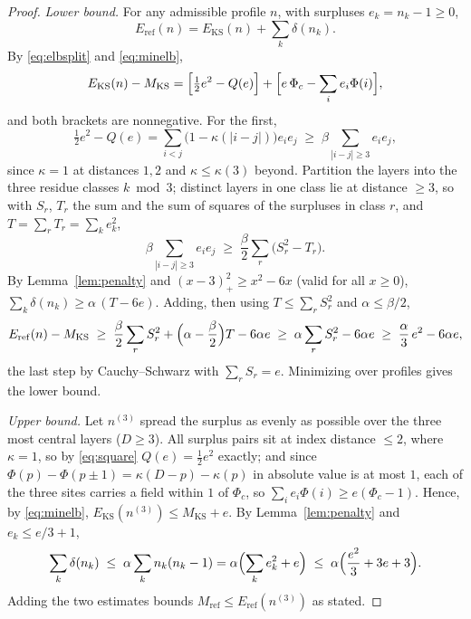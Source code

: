 \documentclass[10pt,a4paper]{amsart}
\newcommand{\KS}{\mathrm{KS}}
\newcommand{\refi}{\mathrm{ref}}
\begin{document}
\begin{proof}
\emph{Lower bound.} For any admissible profile $n$, with surpluses $e_k=n_k-1\ge0$,
\[
E_\refi(n) = E_\KS(n) + \sum_k \delta(n_k).
\]
By \eqref{eq:elbsplit} and \eqref{eq:minelb},
\[
E_\KS(n)-M_\KS = \Bigl[\tfrac12 e^2 - Q(e)\Bigr] + \Bigl[e\,\Phi_c - \sum_i e_i\Phi(i)\Bigr],
\]
and both brackets are nonnegative. For the first,
\[
\tfrac12 e^2 - Q(e) = \sum_{i<j}\bigl(1-\kappa(|i-j|)\bigr)e_i e_j \;\ge\; \beta \!\!\sum_{|i-j|\ge3}\!\! e_i e_j,
\]
since $\kappa=1$ at distances $1,2$ and $\kappa\le\kappa(3)$ beyond. Partition the layers into the three residue classes $k\bmod3$; distinct layers in one class lie at distance $\ge3$, so with $S_r$, $T_r$ the sum and the sum of squares of the surpluses in class $r$, and $T=\sum_r T_r=\sum_k e_k^2$,
\[
\beta \!\!\sum_{|i-j|\ge3}\!\! e_i e_j \;\ge\; \frac\beta2 \sum_r \bigl(S_r^2 - T_r\bigr).
\]
By Lemma~\ref{lem:penalty} and $(x-3)_+^2\ge x^2-6x$ (valid for all $x\ge0$), $\sum_k\delta(n_k)\ge\alpha\,(T-6e)$. Adding, then using $T\le\sum_r S_r^2$ and $\alpha\le\beta/2$,
\[
E_\refi(n)-M_\KS \;\ge\; \frac\beta2\sum_r S_r^2 + \Bigl(\alpha-\frac\beta2\Bigr)T - 6\alpha e
\;\ge\; \alpha\sum_r S_r^2 - 6\alpha e
\;\ge\; \frac\alpha3\,e^2 - 6\alpha e,
\]
the last step by Cauchy--Schwarz with $\sum_r S_r=e$. Minimizing over profiles gives the lower bound.

\emph{Upper bound.} Let $n^{(3)}$ spread the surplus as evenly as possible over the three most central layers ($D\ge3$). All surplus pairs sit at index distance $\le2$, where $\kappa=1$, so by \eqref{eq:square} $Q(e)=\tfrac12 e^2$ exactly; and since $\Phi(p)-\Phi(p\pm1)=\kappa(D-p)-\kappa(p)$ in absolute value is at most $1$, each of the three sites carries a field within $1$ of $\Phi_c$, so $\sum_i e_i\Phi(i)\ge e(\Phi_c-1)$. Hence, by \eqref{eq:minelb}, $E_\KS(n^{(3)})\le M_\KS+e$. By Lemma~\ref{lem:penalty} and $e_k\le e/3+1$,
\[
\sum_k \delta(n_k) \;\le\; \alpha\sum_k n_k(n_k-1) = \alpha\Bigl(\sum_k e_k^2 + e\Bigr) \;\le\; \alpha\Bigl(\frac{e^2}3+3e+3\Bigr).
\]
Adding the two estimates bounds $M_\refi\le E_\refi(n^{(3)})$ as stated.
\end{proof}
\end{document}
